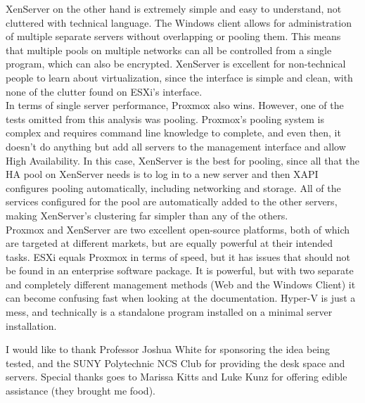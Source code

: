 \documentclass[12pt]{spieman}  %
\begin{document}
XenServer on the other hand is extremely simple and easy to understand, not cluttered with technical language. The Windows client allows for administration of multiple separate servers without overlapping or pooling them. This means that multiple pools on multiple networks can all be controlled from a single program, which can also be encrypted. XenServer is excellent for non-technical people to learn about virtualization, since the interface is simple and clean, with none of the clutter found on ESXi's interface. \\

In terms of single server performance, Proxmox also wins. However, one of the tests omitted from this analysis was pooling. Proxmox's pooling system is complex and requires command line knowledge to complete, and even then, it doesn't do anything but add all servers to the management interface and allow High Availability. In this case, XenServer is the best for pooling, since all that the HA pool on XenServer needs is to log in to a new server and then XAPI configures pooling automatically, including networking and storage. All of the services configured for the pool are automatically added to the other servers, making XenServer's clustering far simpler than any of the others.\\

Proxmox and XenServer are two excellent open-source platforms, both of which are targeted at different markets, but are equally powerful at their intended tasks. ESXi equals Proxmox in terms of speed, but it has issues that should not be found in an enterprise software package. It is powerful, but with two separate and completely different management methods (Web and the Windows Client) it can become confusing fast when looking at the documentation. Hyper-V is just a mess, and technically is a standalone program installed on a minimal server installation.

\appendix    %
\acknowledgments 
I would like to thank Professor Joshua White for sponsoring the idea being tested, and the SUNY Polytechnic NCS Club for providing the desk space and servers. Special thanks goes to Marissa Kitts and Luke Kunz for offering edible assistance (they brought me food).



\end{document}
